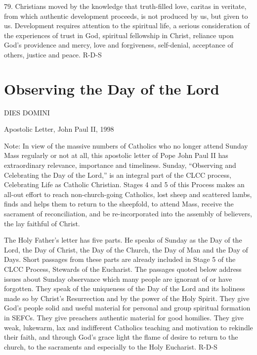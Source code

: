\documentclass[oneside]{book}
\begin{document}
79. Christians moved by the knowledge that truth-filled love, caritas in
veritate, from which authentic development proceeds, is not produced by us, but
given to us. Development requires attention to the spiritual life, a serious
consideration of the experiences of trust in God, spiritual fellowship in
Christ, reliance upon God's providence and mercy, love and forgiveness,
self-denial, acceptance of others, justice and peace.
R-D-S


\chapter{Observing the Day of the Lord}

DIES DOMINI

Apostolic Letter, John Paul II, 1998


Note: In view of the massive numbers of Catholics who no longer attend Sunday
Mass regularly or not at all, this apostolic letter of Pope John Paul II has
extraordinary relevance, importance and timeliness. Sunday, ``Observing and
Celebrating the Day of the Lord,'' is an integral part of the CLCC process,
Celebrating Life as Catholic Christian. Stages 4 and 5 of this Process makes an
all-out effort to reach non-church-going Catholics, lost sheep and scattered
lambs, finds and helps them to return to the sheepfold, to attend Mass, receive
the sacrament of reconciliation, and be re-incorporated into the assembly of
believers, the lay faithful of Christ.

The Holy Father's letter has five parts. He speaks of Sunday as the Day of the
Lord, the Day of Christ, the Day of the Church, the Day of Man and the Day of
Days. Short passages from these parts are already included in Stage 5 of the
CLCC Process, Stewards of the Eucharist. The passages quoted below address
issues about Sunday observance which many people are ignorant of or have
forgotten. They speak of the uniqueness of the Day of the Lord and its holiness
made so by Christ's Resurrection and by the power of the Holy Spirit. They give
God's people solid and useful material for personal and group spiritual
formation in SEFCs. They give preachers authentic material for good
homilies. They give weak, lukewarm, lax and indifferent Catholics teaching and
motivation to rekindle their faith, and through God's grace light the flame of
desire to return to the church, to the sacraments and especially to the Holy
Eucharist.
R-D-S
\end{document}
